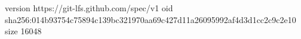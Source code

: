version https://git-lfs.github.com/spec/v1
oid sha256:014b93754c75894c139bc321970aa69c427d11a26095992af4d3d1cc2c9c2e10
size 16048
